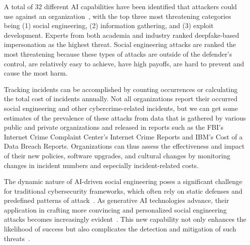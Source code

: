 






%
%
A total of 32 different AI capabilities have been identified that attackers could use against an organization~\citep{mirsky_Threat_Offensive_AI_Organizations_2023}, with the top three most threatening categories being (1) social engineering, (2) information gathering, and (3) exploit development. Experts from both academia and industry ranked deepfake-based impersonation as the highest threat. Social engineering attacks are ranked the most threatening because these types of attacks are outside of the defender's control, are relatively easy to achieve, have high payoffs, are hard to prevent and cause the most harm.



Tracking incidents can be accomplished by counting occurrences or calculating the total cost of incidents annually. Not all organizations report their occurred social engineering and other cybercrime-related incidents, but we can get some estimates of the prevalence of these attacks from data that is gathered by various public and private organizations and released in reports such as the FBI's Internet Crime Complaint Center's Internet Crime Reports and IBM's Cost of a Data Breach Reports. Organizations can thus assess the effectiveness and impact of their new policies, software upgrades, and cultural changes by monitoring changes in incident numbers and especially incident-related costs.







The dynamic nature of AI-driven social engineering poses a significant challenge for traditional cybersecurity frameworks, which often rely on static defenses and predefined patterns of attack~\citep{fakhouri_AI_Driven_Solutions_SE_Attacks_2024}. As generative AI technologies advance, their application in crafting more convincing and personalized social engineering attacks becomes increasingly evident~\citep{blauth_AI_Crime_Overview_Malicious_Use_Abuse_2022}. This new capability not only enhances the likelihood of success but also complicates the detection and mitigation of such threats~\citep{mirsky_Threat_Offensive_AI_Organizations_2023}.



